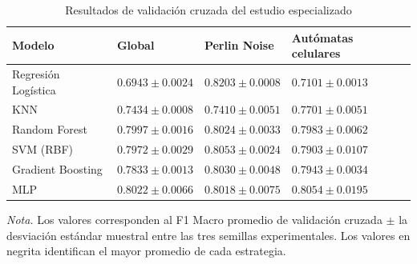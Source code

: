 \begin{table}[htbp]
	\centering
	
	\caption{Resultados de validación cruzada del estudio especializado}
	\label{tab:resultados_validacion_cruzada}
	
	\renewcommand{\arraystretch}{1.3}
	\small
	
	\begin{tabularx}{\textwidth}{
			|>{\raggedright\arraybackslash}p{3.2cm}|
			>{\centering\arraybackslash}X|
			>{\centering\arraybackslash}X|
			>{\centering\arraybackslash}X|
		}
		
		\hline
		
		\rowcolor{gray!15}
		\textbf{Modelo} &
		\textbf{Global} &
		\textbf{Perlin Noise} &
		\textbf{Autómatas celulares} \\ \hline
		
		Regresión Logística &
		$0.6943 \pm 0.0024$ &
		$\mathbf{0.8203 \pm 0.0008}$ &
		$0.7101 \pm 0.0013$ \\ \hline
		
		KNN &
		$0.7434 \pm 0.0008$ &
		$0.7410 \pm 0.0051$ &
		$0.7701 \pm 0.0051$ \\ \hline
		
		Random Forest &
		$0.7997 \pm 0.0016$ &
		$0.8024 \pm 0.0033$ &
		$0.7983 \pm 0.0062$ \\ \hline
		
		SVM (RBF) &
		$0.7972 \pm 0.0029$ &
		$0.8053 \pm 0.0024$ &
		$0.7903 \pm 0.0107$ \\ \hline
		
		Gradient Boosting &
		$0.7833 \pm 0.0013$ &
		$0.8030 \pm 0.0048$ &
		$0.7943 \pm 0.0034$ \\ \hline
		
		MLP &
		$\mathbf{0.8022 \pm 0.0066}$ &
		$0.8018 \pm 0.0075$ &
		$\mathbf{0.8054 \pm 0.0195}$ \\ \hline
		
	\end{tabularx}
	
	\vspace{0.2cm}
	
	\begin{minipage}{\textwidth}
		\footnotesize
		\textit{Nota.} Los valores corresponden al F1 Macro promedio de validación cruzada $\pm$ la desviación estándar muestral entre las tres semillas experimentales. Los valores en negrita identifican el mayor promedio de cada estrategia.
	\end{minipage}
	
\end{table}

